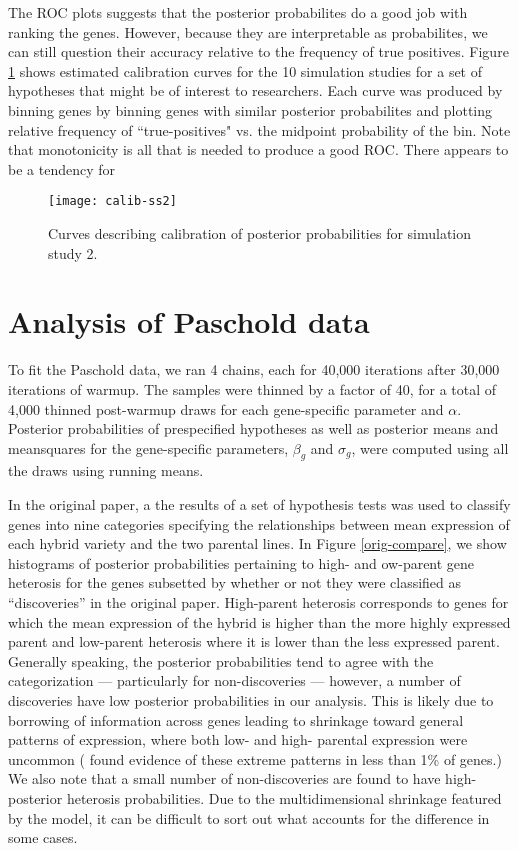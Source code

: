 The ROC plots suggests that the posterior probabilites do a good job with ranking the genes. However, because they are interpretable as probabilites, we can still question their accuracy relative to the frequency of true positives. Figure \ref{calib-ss2} shows estimated calibration curves for the 10 simulation studies for a set of hypotheses that might be of interest to researchers. Each curve was produced by binning genes by binning genes with similar posterior probabilites and plotting relative frequency of ``true-positives" vs. the midpoint probability of the bin. Note that monotonicity is all that is needed to produce a good ROC. There appears to be a tendency for

\begin{figure}[ht!]
\centering
\texttt{[image: calib-ss2]}
\caption{Curves describing calibration of posterior probabilities for simulation study 2.}
\label{calib-ss2}
\end{figure}

\section{Analysis of Paschold data}
\label{analysis}
To fit the Paschold data, we ran 4 chains, each for 40,000 iterations after 30,000 iterations of warmup. The samples were thinned by a factor of 40, for a total of 4,000 thinned post-warmup draws for each gene-specific parameter and $\alpha$. Posterior probabilities of prespecified hypotheses as well as posterior means and meansquares for the gene-specific parameters, $\beta_g$ and $\sigma_g$, were computed using all the draws using running means.

In the original paper, a the results of a set of hypothesis tests was used to classify genes into nine categories specifying the relationships between mean expression of each hybrid variety and the two parental lines. In Figure \ref{orig-compare}, we show histograms of posterior probabilities pertaining to high- and ow-parent gene heterosis for the genes subsetted by whether or not they were classified as ``discoveries'' in the original paper. High-parent heterosis corresponds to genes for which the mean expression of the hybrid is higher than the more highly expressed parent and low-parent heterosis where it is lower than the less expressed parent. Generally speaking, the posterior probabilities tend to agree with the categorization --- particularly for non-discoveries --- however, a number of discoveries have low posterior probabilities in our analysis. This is likely due to borrowing of information across genes leading to shrinkage toward general patterns of expression, where both low- and high- parental expression were uncommon (\citet{paschold} found evidence of these extreme patterns in less than 1\% of genes.) We also note that a small number of non-discoveries are found to have high-posterior heterosis probabilities. Due to the multidimensional shrinkage featured by the model, it can be difficult to sort out what accounts for the difference in some cases.

